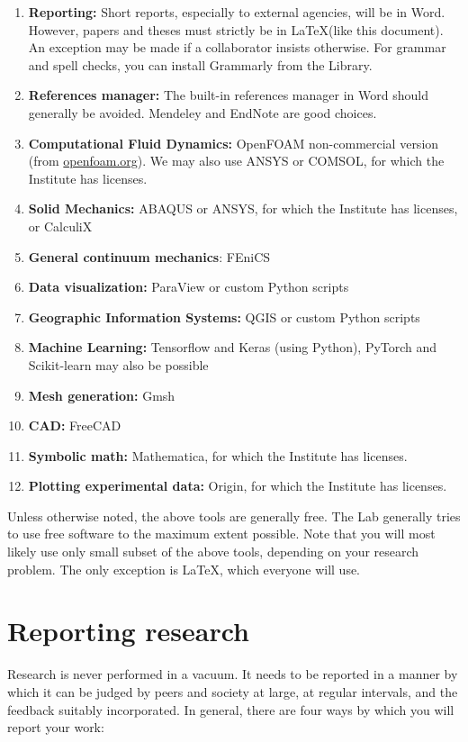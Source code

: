 \documentclass[12pt]{article}
\begin{document}
\begin{enumerate}
\begin{enumerate}
	\end{enumerate}
	\item \textbf{Reporting:} Short reports, especially to external agencies, will be in Word. However, papers and theses must strictly be in \LaTeX (like this document). An exception may be made if a collaborator insists otherwise. For grammar and spell checks, you can install Grammarly from the Library.
	\item \textbf{References manager:} The built-in references manager in Word should generally be avoided. Mendeley and EndNote are good choices.
	\item \textbf{Computational Fluid Dynamics:} OpenFOAM non-commercial version (from \href{http://openfoam.org/}{openfoam.org}). We may also use ANSYS or COMSOL, for which the Institute has licenses.
	\item \textbf{Solid Mechanics:} ABAQUS or ANSYS, for which the Institute has licenses, or CalculiX
	\item \textbf{General continuum mechanics}: FEniCS
	\item \textbf{Data visualization:} ParaView or custom Python scripts
	\item \textbf{Geographic Information Systems:} QGIS or custom Python scripts
	\item \textbf{Machine Learning:} Tensorflow and Keras (using Python), PyTorch and Scikit-learn may also be possible
	\item \textbf{Mesh generation:} Gmsh
	\item \textbf{CAD:} FreeCAD
	\item \textbf{Symbolic math:} Mathematica, for which the Institute has licenses.
	\item \textbf{Plotting experimental data:} Origin, for which the Institute has licenses.
\end{enumerate}

Unless otherwise noted, the above tools are generally free. The Lab generally tries to use free software to the maximum extent possible. Note that you will most likely use only small subset of the above tools, depending on your research problem. The only exception is \LaTeX, which everyone will use.

\newpage

\section{Reporting research}

Research is never performed in a vacuum. It needs to be reported in a manner by which it can be judged by peers and society at large, at regular intervals, and the feedback suitably incorporated. In general, there are four ways by which you will report your work:
\end{document}
